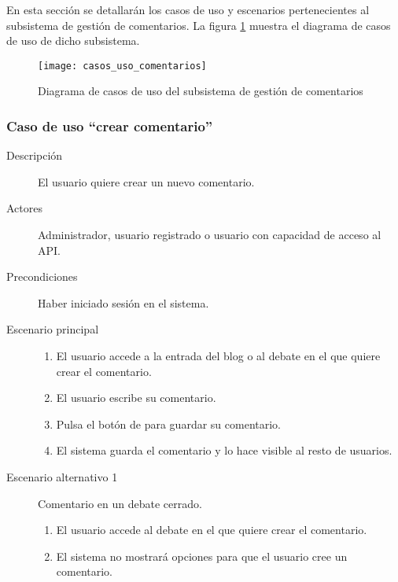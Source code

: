 En esta sección se detallarán los casos de uso y escenarios pertenecientes al subsistema de gestión de comentarios. La figura \ref{fig:casos_uso_subsistema_comentarios} muestra el diagrama de casos de uso de dicho subsistema.

\begin{figure}[h]
\centering
\texttt{[image: casos\_uso\_comentarios]}
\caption{Diagrama de casos de uso del subsistema de gestión de comentarios}
\label{fig:casos_uso_subsistema_comentarios}
\end{figure}


\subsubsection{Caso de uso ``crear comentario''}
\begin{description}
\item[Descripción] El usuario quiere crear un nuevo comentario.
\item[Actores] Administrador, usuario registrado o usuario con capacidad de acceso al API.
\item[Precondiciones] Haber iniciado sesión en el sistema.
\item[Escenario principal] \hfill
						 	\begin{enumerate}
							\item El usuario accede a la entrada del blog o al debate en el que quiere crear el comentario.
							\item El usuario escribe su comentario.
							\item Pulsa el botón de para guardar su comentario.
							\item El sistema guarda el comentario y lo hace visible al resto de usuarios.
							\end{enumerate}
\item[Escenario alternativo 1] Comentario en un  debate cerrado.
							\begin{enumerate}
							\item El usuario accede al debate en el que quiere crear el comentario.
							\item El sistema no mostrará opciones para que el usuario cree un comentario.
							\end{enumerate}
\end{description}


